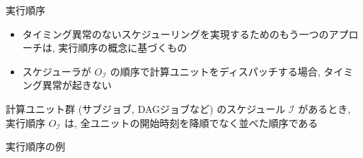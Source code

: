 \begin{frame}{実行順序}
    \begin{itemize}
        \item タイミング異常のないスケジューリングを実現するためのもう一つのアプローチは, 実行順序の概念に基づくもの
        \item スケジューラが $O_{\mathcal{I}}$ の順序で計算ユニットをディスパッチする場合, タイミング異常が起きない
    \end{itemize}

    \begin{definition}
        計算ユニット群 (サブジョブ, DAGジョブなど) のスケジュール $\mathcal{I}$ があるとき, 実行順序 $O_{\mathcal{I}}$ は, 全ユニットの開始時刻を降順でなく並べた順序である
    \end{definition}
\end{frame}

\begin{frame}{実行順序の例}
\end{frame}

